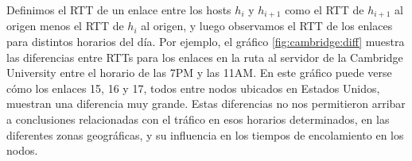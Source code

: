 Definimos el RTT de un enlace entre los hosts $h_i$ y $h_{i+1}$ como el RTT de
$h_{i+1}$ al origen menos el RTT de $h_i$ al origen, y luego observamos el RTT
de los enlaces para distintos horarios del día. Por ejemplo, el gráfico
\ref{fig:cambridge:diff} muestra las diferencias entre RTTs para los enlaces
en la ruta al servidor de la Cambridge University entre el horario de las 7PM
y las 11AM. En este gráfico puede verse cómo los enlaces 15, 16 y 17, todos
entre nodos ubicados en Estados Unidos, muestran una diferencia muy grande.
Estas diferencias no nos permitieron arribar a conclusiones relacionadas con
el tráfico en esos horarios determinados, en las diferentes zonas geográficas,
y su influencia en los tiempos de encolamiento en los nodos.
